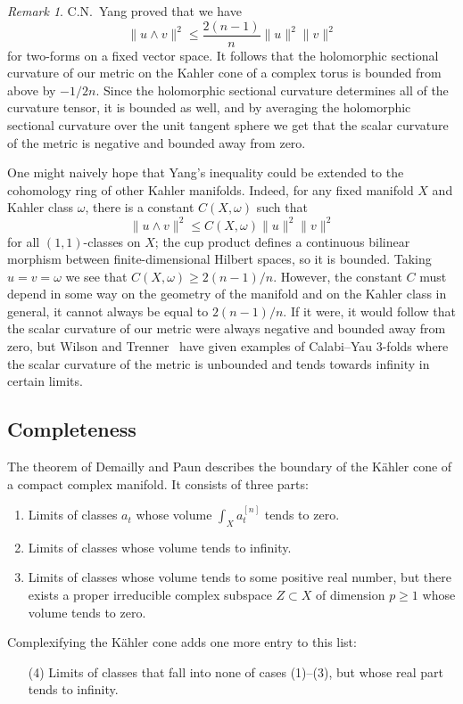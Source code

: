 \documentclass[11pt,a4paper]{amsart}
\theoremstyle{definition}
\theoremstyle{remark}
\newtheorem*{rema}{Remark}
\def\kf{\omega}
\def\ton{u}
\def\ttw{v}
\def\^#1{^{[#1]}}
\begin{document}
\begin{rema}
C.N.~Yang proved that we have 
$$
\| \ton \wedge \ttw \|^2
\leq \frac{2(n-1)}{n} \|\ton\|^2 \|\ttw\|^2
$$
for two-forms on a fixed vector space. It follows that the holomorphic
sectional curvature of our metric on the Kahler cone of a complex torus
is bounded from above by $-1/2n$. Since the holomorphic sectional
curvature determines all of the curvature tensor, it is bounded as well,
and by averaging the holomorphic sectional curvature over the unit
tangent sphere we get that the scalar curvature of the metric is
negative and bounded away from zero.

One might naively hope that Yang's inequality could be extended to the
cohomology ring of other Kahler manifolds. Indeed, for any fixed
manifold $X$ and Kahler class $\kf$, there is a constant $C(X,\kf)$ such
that 
$$
\| \ton \wedge \ttw \|^2
\leq C(X,\kf) \|\ton\|^2 \|\ttw\|^2
$$
for all $(1,1)$-classes on $X$; the cup product defines a continuous
bilinear morphism between finite-dimensional Hilbert spaces, so it is
bounded. Taking $\ton = \ttw = \kf$ we see that $C(X,\kf) \geq
2(n-1)/n$. However, the constant $C$ must depend in some way on the
geometry of the manifold and on the Kahler class in general, it cannot
always be equal to $2(n-1)/n$. If it were, it would follow that the scalar
curvature of our metric were always negative and bounded away from zero,
but Wilson and Trenner~\cite{WilsonTrenner} have given examples of
Calabi--Yau $3$-folds where the scalar curvature of the metric is
unbounded and tends towards infinity in certain limits.
\end{rema}




\subsection*{Completeness}

The theorem of Demailly and Paun describes the boundary of the
K\"{a}hler cone of a compact complex manifold. It consists of three
parts:
\begin{enumerate}
\item Limits of classes $a_t$ whose volume $\int_X a_t\^n$
tends to zero.
\item Limits of classes whose volume tends to infinity.
\item Limits of classes whose volume tends to some positive real
number, but there exists a proper irreducible complex subspace $Z
\subset X$ of dimension $p \geq 1$ whose volume tends to zero.
\end{enumerate}
Complexifying the K\"{a}hler cone adds one more entry to this list:
\begin{enumerate}
\item[(4)] Limits of classes that fall into none of cases (1)--(3), but
whose real part tends to infinity.
\end{enumerate}
\end{document}
